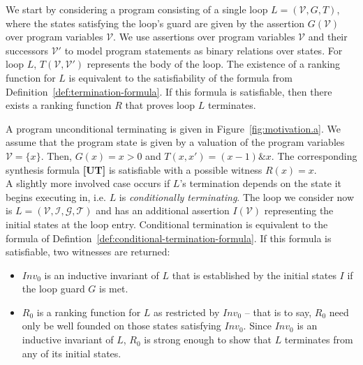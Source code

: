 \documentclass[preprint]{sigplanconf}
\theoremstyle{definition}
\begin{document}
We start by considering a program consisting of a single loop ${L=(\mathcal{V},G,T)}$,
where the states satisfying the loop's guard are given by the assertion $G(\mathcal{V})$ over program variables $\mathcal{V}$.
We use assertions over program variables $\mathcal{V}$ and their successors $\mathcal{V'}$ to model program
statements as binary relations over states. For loop $L$, $T(\mathcal{V}, \mathcal{V'})$
represents the body of the loop. 
%
%
The existence of a ranking function for $L$ is equivalent to the satisfiability
of the formula from Definition~\ref{def:termination-formula}.  If this formula is satisfiable,
then there exists a ranking function $R$ that proves loop $L$ terminates.

A program unconditional terminating is given in Figure~\ref{fig:motivation.a}. 
We assume that the program state is given by a valuation of the
program variables $\mathcal{V} = \{x\}$. Then, 
$G(x) = x>0$ and $T(x,x') = (x-1) \& x$. 
The corresponding 
synthesis formula {\bf [UT]} is satisfiable with a possible witness $R(x) = x$.\\

A slightly more involved case occurs if $L$'s termination depends on the state it begins
executing in, i.e. $L$ is \emph{conditionally terminating}. 
The loop we consider now is $L=(\mathcal{V,I,G,T})$ and has an additional assertion $I(\mathcal{V})$ 
representing the initial states at the loop entry.
Conditional termination is equivalent to the
formula of Defintion~\ref{def:conditional-termination-formula}. If this formula is satisfiable,
two witnesses are returned:
\begin{itemize}
\item $Inv_0$ is an inductive invariant of $L$ that is established by the initial states $I$ if the loop
guard $G$ is met. 
\item $R_0$ is a ranking function for $L$ as restricted by $Inv_0$ -- that is to say, $R_0$ need only
be well founded on those states satisfying $Inv_0$.  Since $Inv_0$ is an inductive invariant of $L$,
$R_0$ is strong enough to show that $L$ terminates from any of its initial states.
\end{itemize}
  
\end{document}
